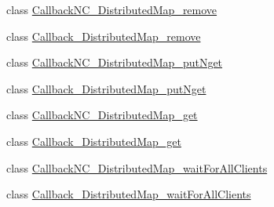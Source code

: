 \begin{DoxyCompactItemize}
\item 
class \hyperlink{class_global_table_1_1_callback_n_c___distributed_map__remove}{CallbackNC\_\-DistributedMap\_\-remove}
\item 
class \hyperlink{class_global_table_1_1_callback___distributed_map__remove}{Callback\_\-DistributedMap\_\-remove}
\item 
class \hyperlink{class_global_table_1_1_callback_n_c___distributed_map__put_nget}{CallbackNC\_\-DistributedMap\_\-putNget}
\item 
class \hyperlink{class_global_table_1_1_callback___distributed_map__put_nget}{Callback\_\-DistributedMap\_\-putNget}
\item 
class \hyperlink{class_global_table_1_1_callback_n_c___distributed_map__get}{CallbackNC\_\-DistributedMap\_\-get}
\item 
class \hyperlink{class_global_table_1_1_callback___distributed_map__get}{Callback\_\-DistributedMap\_\-get}
\item 
class \hyperlink{class_global_table_1_1_callback_n_c___distributed_map__wait_for_all_clients}{CallbackNC\_\-DistributedMap\_\-waitForAllClients}
\item 
class \hyperlink{class_global_table_1_1_callback___distributed_map__wait_for_all_clients}{Callback\_\-DistributedMap\_\-waitForAllClients}
\end{DoxyCompactItemize}
